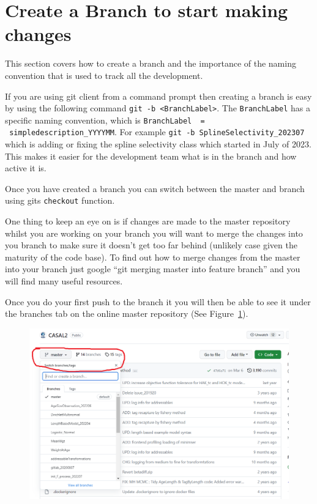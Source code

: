 \section{Create a Branch to start making changes\label{sec:maintain_repo}}

This section covers how to create a branch and the importance of the naming convention that is used to track all the development. 


If you are using git client from a command prompt then creating a branch is easy by using the following command \texttt{git -b <BranchLabel>}. The \texttt{BranchLabel} has a specific naming convention, which is  \texttt{BranchLabel \ = \ simpledescription\_YYYYMM}. For example \texttt{git -b SplineSelectivity\_202307} which is adding or fixing the spline selectivity class which started in July of 2023. This makes it easier for the development team what is in the branch and how active it is.

Once you have created a branch you can switch between the master and branch using gits \texttt{checkout} function.


One thing to keep an eye on is if changes are made to the master repository whilst you are working on your branch you will want to merge the changes into you branch to make sure it doesn't get too far behind (unlikely case given the maturity of the code base). To find out how to merge changes from the master into your branch just google \enquote{git merging master into feature branch} and you will find many useful resources.


Once you do your first push to the branch it you will then be able to see it under the branches tab on the online master repository (See Figure~\ref{fig:branchtab}).

\begin{figure}[!ht]
	\includegraphics[scale=0.6]{Figures/branch_tab.png}
	\caption{}\label{fig:branchtab}
\end{figure}